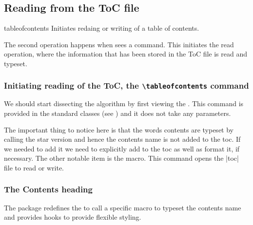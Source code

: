 \subsection{Reading from the ToC file}

\begin{docCommand}{tableofcontents}{}{}
Initiates redaing or writing of a table of contents.
\end{docCommand}

The second operation happens when \latexe sees a  command. This initiates the read operation, where the information that has been stored in the ToC file is read and typeset.

\subsubsection{Initiating reading of the ToC, the \texttt{\textbackslash tableofcontents} command}

We should start dissecting the algorithm by first viewing the . This command is provided in
the standard classes (see \pageref{tableofcontents}) and it does not take any parameters.

\begin{teXX}
\setcounter{tocdepth}{2}
\newcommand\tableofcontents{%
    \if@twocolumn
      \@restonecoltrue\onecolumn
    \else
      \@restonecolfalse
    \fi
    \chapter*{\contentsname
        \@mkboth{%
           \MakeUppercase\contentsname}{\MakeUppercase\contentsname}}%
          \@starttoc{toc} (*@\label{starttoc}@*)
    \if@restonecol\twocolumn\fi
    }
\end{teXX}


The important thing to notice here is that the words contents are typeset by calling the star version and hence the contents name is not added to the toc. If we needed to add it we need to explicitly add to the toc as well as format it, if necessary. The other notable item is the  macro. This command opens the |toc| file to read or write.

\subsubsection{The Contents heading}
 
 The  package redefines the \cmd{\tableofcontents}  to call a specific macro to typeset
 the contents name and provides hooks to provide flexible styling. 
              
